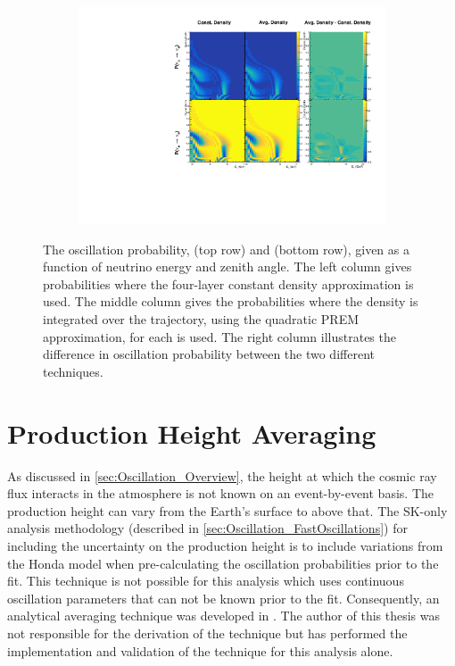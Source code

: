\begin{figure}[h]
  \begin{subfigure}[t]{\textwidth}
    \includegraphics[width=\textwidth, trim={0mm 0mm 0mm 0mm}, clip,page=1]{Figures/Oscillation/AverageDensityPREMModel.pdf}
  \end{subfigure}
  \caption{The oscillation probability,  (top row) and  (bottom row), given as a function of neutrino energy and zenith angle. The left column gives probabilities where the four-layer constant density approximation is used. The middle column gives the probabilities where the density is integrated over the trajectory, using the quadratic PREM approximation, for each  is used. The right column illustrates the difference in oscillation probability between the two different techniques.}
  \label{fig:Oscillation_SK_AverageDensityPREMModel}
\end{figure}

\clearpage

\section{Production Height Averaging}
\label{sec:Oscillation_ProdHAvergaing}

As discussed in \autoref{sec:Oscillation_Overview}, the height at which the cosmic ray flux interacts in the atmosphere is not known on an event-by-event basis. The production height can vary from the Earth's surface to  above that. The SK-only analysis methodology (described in \autoref{sec:Oscillation_FastOscillations}) for including the uncertainty on the production height is to include variations from the Honda model when pre-calculating the oscillation probabilities prior to the fit. This technique is not possible for this analysis which uses continuous oscillation parameters that can not be known prior to the fit. Consequently, an analytical averaging technique was developed in \cite{t2k_tn_425}. The author of this thesis was not responsible for the derivation of the technique but has performed the implementation and validation of the technique for this analysis alone.

